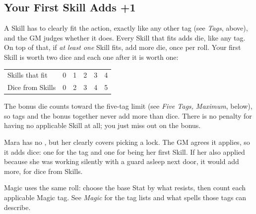 \subsection*{Your First Skill Adds +1}
A Skill has to clearly fit the action, exactly like any other tag
(see \emph{Tags}, above), and the GM judges whether it does. Every
Skill that fits adds  die, like any tag. On top of that, if
\emph{at least one} Skill fits, add  more die, once per roll.
Your first Skill is worth two dice and each one after it is worth one:

\begin{center}
\begin{tabular}{@{}lccccc@{}}
Skills that fit & 0 & 1 & 2 & 3 & 4\\
Dice from Skills & 0 & 2 & 3 & 4 & 5\\
\end{tabular}
\end{center}

The bonus die counts toward the five-tag limit (see \emph{Five Tags,
Maximum}, below), so tags and the bonus together never add more than
 dice. There is no penalty for having no applicable Skill at
all; you just miss out on the bonus.

\begin{example}
Mara has no , but her 
clearly covers picking a lock. The GM agrees it applies, so it adds
 dice: one for the tag and one for being her first Skill. If her
 also applied because she was working silently
with a guard asleep next door, it would add  more, for 
dice from Skills.
\end{example}

Magic uses the same roll: choose the base Stat by what resists, then
count each applicable Magic tag. See \emph{Magic} for the tag lists and
what spells those tags can describe.

